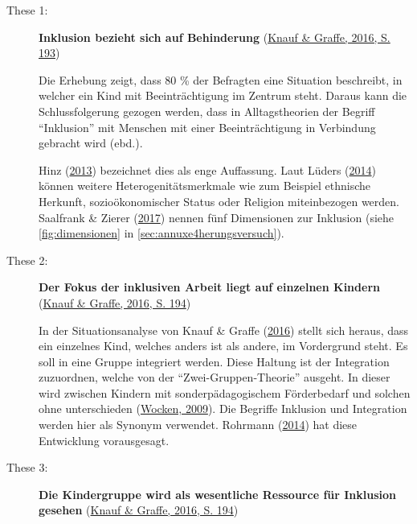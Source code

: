 \documentclass[
  ngerman,
  11pt,
  paper=a4,
  twoside,
  titlepage=true,
  openright,
  abstract=on,
  toc=listofnumbered,
  numbers=noenddot,
  chapterprefix=true,
  headings=optiontohead,
  svgnames,
  dvipsnames]{scrreprt}
\begin{document}
\begin{description}
\item[These 1:]
\textbf{Inklusion bezieht sich auf Behinderung}
(\protect\hyperlink{ref-alltagsTheorienUeberInklusion}{Knauf \& Graffe,
2016, S. 193})

Die Erhebung zeigt, dass 80 \% der Befragten eine Situation beschreibt,
in welcher ein Kind mit Beeinträchtigung im Zentrum steht. Daraus kann
die Schlussfolgerung gezogen werden, dass in Alltagstheorien der Begriff
“Inklusion” mit Menschen mit einer Beeinträchtigung in Verbindung
gebracht wird (ebd.).

Hinz (\protect\hyperlink{ref-Hinz2013}{2013}) bezeichnet dies als enge
Auffassung. Laut Lüders (\protect\hyperlink{ref-luders2014}{2014})
können weitere Heterogenitätsmerkmale wie zum Beispiel ethnische
Herkunft, sozioökonomischer Status oder Religion miteinbezogen werden.
Saalfrank \& Zierer
(\protect\hyperlink{ref-saalfrank_inklusion_2017}{2017}) nennen fünf
Dimensionen zur Inklusion (siehe \cref{fig:dimensionen} in
\cref{sec:annuxe4herungsversuch}).
\item[These 2:]
\textbf{Der Fokus der inklusiven Arbeit liegt auf einzelnen Kindern}
(\protect\hyperlink{ref-alltagsTheorienUeberInklusion}{Knauf \& Graffe,
2016, S. 194})

In der Situationsanalyse von Knauf \& Graffe
(\protect\hyperlink{ref-alltagsTheorienUeberInklusion}{2016}) stellt
sich heraus, dass ein einzelnes Kind, welches anders ist als andere, im
Vordergrund steht. Es soll in eine Gruppe integriert werden. Diese
Haltung ist der Integration zuzuordnen, welche von der
“Zwei-Gruppen-Theorie” ausgeht. In dieser wird zwischen Kindern mit
sonderpädagogischem Förderbedarf und solchen ohne unterschieden
(\protect\hyperlink{ref-wocken}{Wocken, 2009}). Die Begriffe Inklusion
und Integration werden hier als Synonym verwendet. Rohrmann
(\protect\hyperlink{ref-rohrmann_inklusion_2014}{2014}) hat diese
Entwicklung vorausgesagt.
\item[These 3:]
\textbf{Die Kindergruppe wird als wesentliche Ressource für Inklusion
gesehen} (\protect\hyperlink{ref-alltagsTheorienUeberInklusion}{Knauf \&
Graffe, 2016, S. 194})


\end{description}
\end{document}
